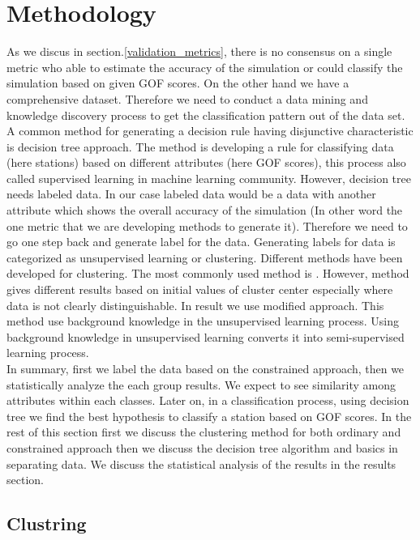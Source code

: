 
\section{Methodology} \label{methodology}

As we discus in section.\ref{validation_metrics}, there is no consensus on a single metric who able to estimate the accuracy of the simulation or could classify the simulation based on given GOF scores. On the other hand we have a comprehensive dataset. Therefore we need to conduct a data mining and knowledge discovery process to get the classification pattern out of the data set. A common method for generating a decision rule having disjunctive characteristic is decision tree approach. The method is developing a rule for classifying data (here stations) based on different attributes (here GOF scores), this process also called supervised learning in machine learning community. However, decision tree needs labeled data. In our case labeled data would be a data with another attribute which shows the overall accuracy of the simulation (In other word the one metric that we are developing methods to generate it). Therefore we need to go one step back and generate label for the data. Generating labels for data is categorized as unsupervised learning or clustering. Different methods have been developed for clustering. The most commonly used method is \kmeans{}. However, \kmeans{} method gives different results based on initial values of cluster center especially where data is not clearly distinguishable. In result we use modified \kmeans{} approach. This method use background knowledge in the unsupervised learning process. Using background knowledge in unsupervised learning converts it into semi-supervised learning process.\\
In summary, first we label the data based on the constrained \kmeans{} approach, then we statistically analyze the each group results. We expect to see similarity among attributes within each classes. Later on, in a classification process, using decision tree we find the best hypothesis to classify a station based on GOF scores. In the rest of this section first we discuss the clustering method for both ordinary and constrained \kmeans{} approach then we discuss the decision tree algorithm and basics in separating data. We discuss the statistical analysis of the results in the results section. \\


\subsection{Clustring}

